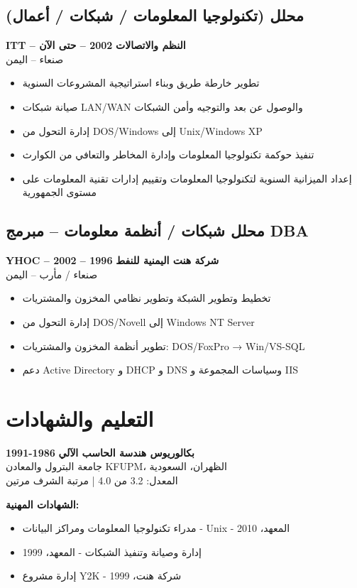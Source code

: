 \documentclass[a4paper,11pt]{article}
\begin{document}
\begin{otherlanguage}{arabic}
\subsection*{محلل (تكنولوجيا المعلومات / شبكات / أعمال)}
\textbf{ITT – النظم والاتصالات} \hfill \textbf{2002 – حتى الآن} \\
صنعاء – اليمن
\begin{itemize}
\item تطوير خارطة طريق وبناء استراتيجية المشروعات السنوية
\item صيانة شبكات LAN/WAN والوصول عن بعد والتوجيه وأمن الشبكات
\item إدارة التحول من DOS/Windows إلى Unix/Windows XP
\item تنفيذ حوكمة تكنولوجيا المعلومات وإدارة المخاطر والتعافي من الكوارث
\item إعداد الميزانية السنوية لتكنولوجيا المعلومات وتقييم إدارات تقنية المعلومات على مستوى الجمهورية
\end{itemize}

\subsection*{محلل شبكات / أنظمة معلومات – مبرمج DBA}
\textbf{YHOC – شركة هنت اليمنية للنفط} \hfill \textbf{1996 – 2002} \\
صنعاء / مأرب – اليمن
\begin{itemize}
\item تخطيط وتطوير الشبكة وتطوير نظامي المخزون والمشتريات
\item إدارة التحول من DOS/Novell إلى Windows NT Server
\item تطوير أنظمة المخزون والمشتريات: DOS/FoxPro → Win/VS-SQL
\item دعم Active Directory و DHCP و DNS وسياسات المجموعة و IIS
\end{itemize}

\section*{التعليم والشهادات}
\textbf{بكالوريوس هندسة الحاسب الآلي} \hfill \textbf{1986-1991} \\
جامعة البترول والمعادن KFUPM، الظهران، السعودية \\
المعدل: 3.2 من 4.0 | مرتبة الشرف مرتين

\textbf{الشهادات المهنية:}
\begin{itemize}
\item مدراء تكنولوجيا المعلومات ومراكز البيانات - Unix - المعهد، 2010
\item إدارة وصيانة وتنفيذ الشبكات - المعهد، 1999
\item إدارة مشروع Y2K - شركة هنت، 1999
\end{itemize}


\end{otherlanguage}
\end{document}
